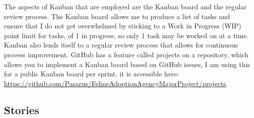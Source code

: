 The aspects of Kanban that are employed are the Kanban board and the regular review process. The Kanban board allows me to produce a list of tasks and ensure that I do not get overwhelmed by sticking to a Work in Progress (WIP) point limit for tasks, of 1 in progress, so only 1 task may be worked on at a time. Kanban also lends itself to a regular review process that allows for continuous process improvement. GitHub has a feature called projects on a repository, which allows you to implement a Kanban board based on GitHub issues, I am using this for a public Kanban board per sprint, it is accessible here: \url{https://github.com/Pasarus/FelineAdoptionAgencyMajorProject/projects}.

\subsection{Stories}\label{STORIES}

